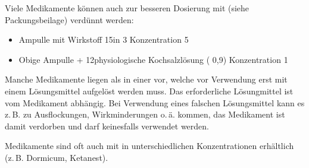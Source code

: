 {%

Viele Medikamente können auch zur besseren Dosierung
mit  (siehe
Packungsbeilage) verdünnt werden:
\begin{itemize}
  \item Ampulle mit Wirkstoff 15\Mg* in 3\Ml* 
  {\dotfill} Konzentration 5\,\nicefrac{\Mg}{\Ml}
  \item Obige Ampulle 
  + 12\Ml* physiologische Kochsalzlösung 
  ( 0,9\PC) 
  {\dotfill} Konzentration 1\,\nicefrac{\Mg}{\Ml}
\end{itemize}

Manche Medikamente liegen als  in einer
 vor, welche vor Verwendung erst mit
einem  Lösungsmittel aufgelöst werden muss.
Das erforderliche Lösungmittel ist vom Medikament abhängig.
Bei Verwendung eines falschen Lösungsmittel kann es z.\,B.
zu Ausflockungen, Wirkminderungen o.\,ä. kommen, das
Medikament ist damit verdorben und darf keinesfalls
verwendet werden.

}
{}
{}
{}
{}

\begin{Danger}
  \item Medikamente sind oft auch mit  in 
  unterschiedlichen Konzentrationen erhältlich 
  (z.\,B. Dormicum{\texttrademark}, Ketanest{\texttrademark}).
\end{Danger}
\begin{Synopsis}
\end{Synopsis}

